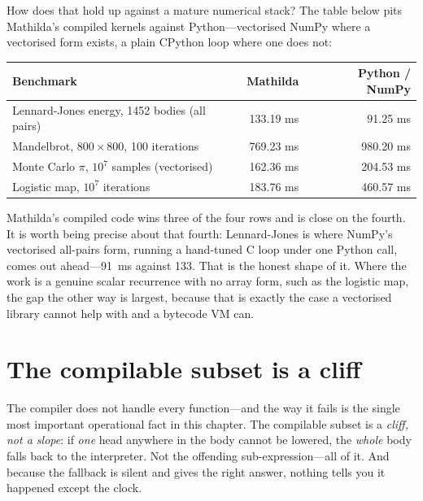 How does that hold up against a mature numerical stack? The table below pits
Mathilda's compiled kernels against Python---vectorised NumPy where a vectorised
form exists, a plain CPython loop where one does not:

\begin{center}
\begin{tabular}{lrr}
\hline
Benchmark & Mathilda & Python / NumPy \\
\hline
Lennard-Jones energy, 1452 bodies (all pairs) & 133.19 ms & 91.25 ms \\
Mandelbrot, \(800\times800\), 100 iterations & 769.23 ms & 980.20 ms \\
Monte Carlo \(\pi\), \(10^{7}\) samples (vectorised) & 162.36 ms & 204.53 ms \\
Logistic map, \(10^{7}\) iterations & 183.76 ms & 460.57 ms \\
\hline
\end{tabular}
\end{center}

\noindent Mathilda's compiled code wins three of the four rows and is close on the
fourth. It is worth being precise about that fourth: Lennard-Jones is where
NumPy's vectorised all-pairs form, running a hand-tuned C loop under one Python
call, comes out ahead---91~ms against 133. That is the honest shape of it. Where
the work is a genuine scalar recurrence with no array form, such as the logistic
map, the gap the other way is largest, because that is exactly the case a
vectorised library cannot help with and a bytecode VM can.

\section{The compilable subset is a cliff}
\label{sec:compile-cliff}

The compiler does not handle every function---and the way it fails is the single
most important operational fact in this chapter. The compilable
subset is a \emph{cliff, not a slope}: if
\emph{one} head anywhere in the body cannot be lowered, the \emph{whole} body
falls back to the interpreter. Not the offending sub-expression---all of it. And
because the fallback is silent and gives the right answer, nothing tells you it
happened except the clock.

